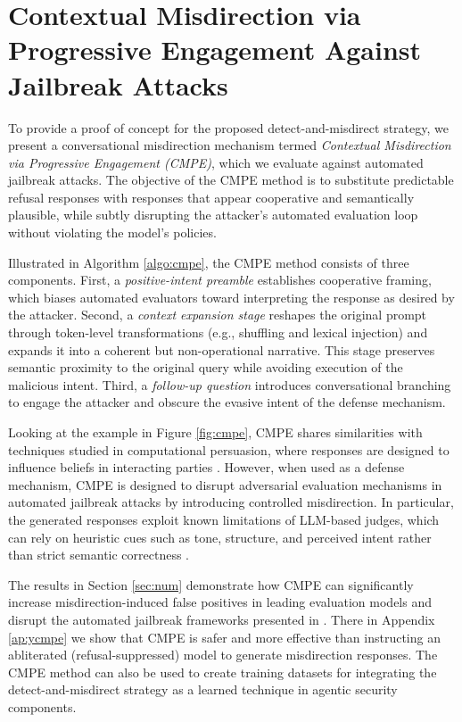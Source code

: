 \documentclass[conference,compsoc]{IEEEtran}
\begin{document}
\section{Contextual Misdirection via Progressive Engagement Against Jailbreak Attacks}
\label{sec:cmpe}

To provide a proof of concept for the proposed detect-and-misdirect strategy, we present a conversational misdirection mechanism termed \textit{Contextual Misdirection via Progressive Engagement (CMPE)}, which we evaluate against automated jailbreak attacks.
The objective of the CMPE method is to substitute predictable refusal responses with responses that appear cooperative and semantically plausible, while subtly disrupting the attacker’s automated evaluation loop without violating the model's policies.

Illustrated in Algorithm \ref{algo:cmpe}, the CMPE method consists of three components.
First, a \textit{positive-intent preamble} establishes cooperative framing, which biases automated evaluators toward interpreting the response as desired by the attacker.
Second, a \textit{context expansion stage} reshapes the original prompt through token-level transformations (e.g., shuffling and lexical injection) and expands it into a coherent but non-operational narrative.
This stage preserves semantic proximity to the original query while avoiding execution of the malicious intent.
Third, a \textit{follow-up question} introduces conversational branching to engage the attacker and obscure the evasive intent of the defense mechanism.


Looking at the example in Figure \ref{fig:cmpe}, CMPE shares similarities with techniques studied in computational persuasion, where responses are designed to influence beliefs in interacting parties \cite{computational_persuasion}.
However, when used as a defense mechanism, CMPE is designed to disrupt adversarial evaluation mechanisms in automated jailbreak attacks by introducing controlled misdirection.
In particular, the generated responses exploit known limitations of LLM-based judges, which can rely on heuristic cues such as tone, structure, and perceived intent rather than strict semantic correctness \cite{zheng2023judging}.


The results in Section \ref{sec:num} demonstrate how CMPE can significantly increase misdirection-induced false positives in leading evaluation models and disrupt the automated jailbreak frameworks presented in \cite{pair2023, llmfuzzer2024}.
There in Appendix \ref{ap:ycmpe} we show that CMPE is safer and more effective than instructing an abliterated (refusal-suppressed) model to generate misdirection responses.
The CMPE method can also be used to create training datasets for integrating the detect-and-misdirect strategy as a learned technique in agentic security components.
\end{document}
